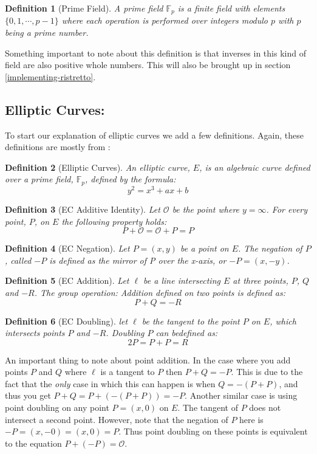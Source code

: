 \documentclass{article}
\newtheorem{definition}{Definition}[section]
\renewcommand{\O}{\mathcal{O}}
\newcommand{\F}{\mathbb{F}}
\begin{document}
\begin{definition}[Prime Field]
	A prime field $\F_p$ is a finite field with elements $\{0, 1,
	\cdots, p-1\}$ where each operation is performed over integers
	modulo $p$ with $p$ being a prime number.
\end{definition}

Something important to note about this definition is that inverses in
this kind of field are also positive whole numbers. This will also be brought up in section \ref{implementing-ristretto}.

\subsection{Elliptic Curves:}\label{elliptic-curves}

To start our explanation of elliptic curves we add a few
definitions. Again, these definitions are mostly from
\cite{elliptic-curves}:

\begin{definition}[Elliptic Curves]
	An elliptic curve, $E$, is an algebraic curve defined over a
	prime field, $\F_p$, defined by the formula:
	$$y^2 = x^3 + ax + b$$
\end{definition}

\begin{definition}[EC Additive Identity]
	Let $\O$ be the point where $y = \infty$. For every point, $P$,
	on $E$ the following property holds:
	$$P + \O = \O + P = P$$
\end{definition}

\begin{definition}[EC Negation]
	Let $P = (x,y)$ be a point on $E$. The negation of $P$, called $-P$
	is defined as the mirror of P over the x-axis, or $-P = (x,-y)$.
\end{definition}

\begin{definition}[EC Addition]
	Let $\ell$ be a line intersecting $E$ at three points, $P$, $Q$ and
	$-R$. The group operation: Addition defined on two points is defined
	as:
	$$P + Q = {-R}$$
\end{definition}

\begin{definition}[EC Doubling]
	let $\ell$ be the tangent to the point $P$ on $E$, which
	intersects points $P$ and $-R$. Doubling $P$ can bedefined as:
	$$2P = P + P = R$$
\end{definition}

An important thing to note about point addition. In the case where
you add points $P$ and $Q$ where $\ell$ is a tangent to $P$ then $P +
Q = -P$. This is due to the fact that the \textit{only} case in which
this can happen is when $Q = -(P + P)$, and thus you get $P + Q = P +
(-(P + P)) = -P$. Another similar case is using point doubling on any
point $P = (x,0)$ on $E$. The tangent of $P$ does not intersect
a second point. However, note that the negation of $P$ here is $-P =
(x,-0) = (x,0) = P$. Thus point doubling on these points is equivalent
to the equation $P + (-P) = \O$.
\end{document}
